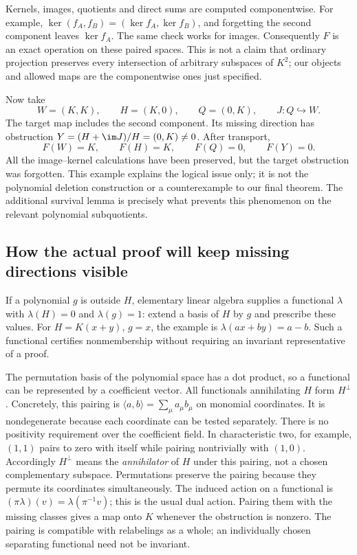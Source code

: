 Kernels, images, quotients and direct sums are computed componentwise.
For example, $\ker(f_A,f_B)=(\ker f_A,\ker f_B)$, and forgetting the
second component leaves $\ker f_A$. The same check works for images.
Consequently $F$ is an exact operation on these paired spaces.
This is not a claim that ordinary projection preserves every
intersection of arbitrary subspaces of $K^2$; our objects and allowed
maps are the componentwise ones just specified.

Now take
\[
 W=(K,K),\qquad H=(K,0),\qquad Q=(0,K),\qquad
                         J:Q\hookrightarrow W.
\]
The target map includes the second component. Its missing direction
has obstruction
$Y=(H+\im J)/H=(0,K)\ne0$.
After transport,
\[
             F(W)=K,\qquad F(H)=K,\qquad F(Q)=0,\qquad F(Y)=0.
\]
All the image--kernel calculations have been preserved, but the
target obstruction was forgotten.
This example explains the logical issue only; it is not the
polynomial deletion construction or a counterexample to our final
theorem. The additional survival lemma is precisely what prevents
this phenomenon on the relevant polynomial subquotients.

\subsection{How the actual proof will keep missing directions visible}
If a polynomial $g$ is outside $H$, elementary linear algebra supplies
a functional $\lambda$ with $\lambda(H)=0$ and $\lambda(g)=1$:
extend a basis of $H$ by $g$ and prescribe these values.
For $H=K(x+y)$, $g=x$, the example is
$\lambda(ax+by)=a-b$.
Such a functional certifies nonmembership without requiring an
invariant representative of a proof.

The permutation basis of the polynomial space has a dot product,
so a functional can be represented by a coefficient vector.
All functionals annihilating $H$ form $H^\perp$.
Concretely, this pairing is
$\langle a,b\rangle=\sum_\mu a_\mu b_\mu$ on monomial coordinates.
It is nondegenerate because each coordinate can be tested separately.
There is no positivity requirement over the coefficient field.
In characteristic two, for example, $(1,1)$ pairs to zero with itself
while pairing nontrivially with $(1,0)$.
Accordingly $H^\perp$ means the \emph{annihilator} of $H$ under this
pairing, not a chosen complementary subspace.
Permutations preserve the pairing because they permute its coordinates
simultaneously. The induced action on a functional is
$(\pi\lambda)(v)=\lambda(\pi^{-1}v)$; this is the usual dual action.
Pairing them with the missing classes gives a map onto $K$ whenever
the obstruction is nonzero. The pairing is compatible with
relabelings as a whole; an individually chosen separating functional
need not be invariant.

